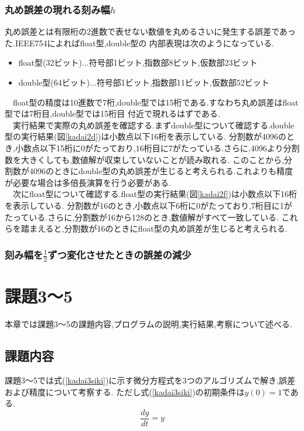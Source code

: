 \documentclass[dvipdfmx]{jarticle}
\begin{document}
    \subsubsection{丸め誤差の現れる刻み幅$h$}
    丸め誤差とは有限桁の2進数で表せない数値を丸めるさいに発生する誤差であった.IEEE754によればfloat型,double型の
    内部表現は次のようになっている.
    \begin{itemize}
      \item float型(32ビット)$\dots$符号部1ビット,指数部8ビット,仮数部23ビット
      \item double型(64ビット)$\dots$符号部1ビット,指数部11ビット,仮数部52ビット
    \end{itemize}
    　float型の精度は10進数で7桁,double型では15桁である.すなわち丸め誤差はfloat型では7桁目,double型では15桁目
    付近で現れるはずである.\\
    　実行結果で実際の丸め誤差を確認する.まずdouble型について確認する.double型の実行結果(図\ref{kadai2d})は小数点以下16桁を表示している.
    分割数が4096のとき,小数点以下15桁に0がたっており,16桁目に7がたっている.さらに,4096より分割数を大きくしても,数値解が収束していないことが読み取れる.
    このことから,分割数が4096のときにdouble型の丸め誤差が生じると考えられる.これよりも精度が必要な場合は多倍長演算を行う必要がある.\\
    　次にfloat型について確認する.float型の実行結果(図\ref{kadai2f})は小数点以下16桁を表示している.
    分割数が16のとき,小数点以下6桁に0がたっており,7桁目に1がたっている.さらに,分割数が16から128のとき,数値解がすべて一致している.
    これらを踏まえると,分割数が16のときにfloat型の丸め誤差が生じると考えられる.

    \subsubsection{刻み幅を$\frac{1}{2}$ずつ変化させたときの誤差の減少}

    \section{課題3～5}
    本章では課題3～5の課題内容,プログラムの説明,実行結果,考察について述べる.
    \subsection{課題内容}
    課題3～5では式(\ref{kadai3siki})に示す微分方程式を3つのアルゴリズムで解き,誤差および精度について考察する.
    ただし式(\ref{kadai3siki})の初期条件は$y(0)=1$である.
      \begin{equation}
      \frac{dy}{dt} = y
          \label{kadai3siki}
        \end{equation}
\end{document}
